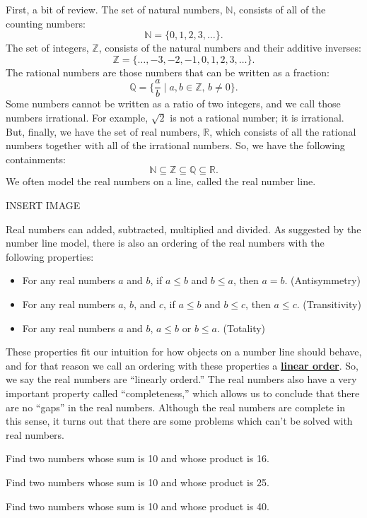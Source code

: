 \documentclass[11pt]{article}
\newenvironment{task}
	{\begin{mdframed}[linecolor=lightgray, linewidth=3pt]\raggedright}
	{\end{mdframed}}
\renewcommand\emph[1]{\underline{\bf{#1}}} %
\theoremstyle{definition}
\begin{document}
First, a bit of review. The set of natural numbers, $\mathbb{N}$, consists of all of the counting numbers:
\[ \mathbb{N} = \{ 0, 1, 2, 3, \dots \}.\]
The set of integers, $\mathbb{Z}$, consists of the natural numbers and their additive inverses:
\[ \mathbb{Z} = \{ \dots,-3,-2,-1,0, 1, 2, 3, \dots \}.\]
The rational numbers are those numbers that can be written as a fraction:
\[ \mathbb{Q} = \{ \frac{a}{b} \mid a, b\in \mathbb{Z},\, b \neq 0 \}.\]
Some numbers cannot be written as a ratio of two integers, and we call those numbers irrational. For example, $\sqrt{2}$ is not a rational number; it is
irrational. But, finally, we have the set of real numbers, $\mathbb{R}$, which consists of all the rational numbers together with all of the irrational numbers. 
So, we have the following containments:
\[ \mathbb{N} \subseteq \mathbb{Z} \subseteq \mathbb{Q} \subseteq \mathbb{R}.\]
We often model the real numbers on a line, called the real number line. 
\begin{center}
  INSERT IMAGE
\end{center}
Real numbers can added, subtracted, multiplied and divided. As suggested by the number line model, there is also an ordering of the real 
numbers with the following properties:
\begin{itemize}
  \item For any real numbers $a$ and $b$, if $a\leq b$ and $b\leq a$, then $a=b$. (Antisymmetry)
  \item For any real numbers $a$, $b$, and $c$, if $a \leq b$ and $b\leq c$, then $a\leq c$. (Transitivity)
  \item For any real numbers $a$ and $b$, $a\leq b$ or $b\leq a$. (Totality)
\end{itemize}

These properties fit our intuition for how objects on a number line should behave, and for that reason we call an ordering with these properties a 
\emph{linear order}. So, we say the real numbers are ``linearly orderd.'' The real numbers also have a very important property called ``completeness,'' 
which allows us to conclude that there are no ``gaps'' in the real numbers. Although the real numbers are complete in this sense, it turns out that there 
are some problems which can't be solved with real numbers.

\begin{task}
  Find two numbers whose sum is 10 and whose product is 16.

  Find two numbers whose sum is 10 and whose product is 25.

  Find two numbers whose sum is 10 and whose product is 40.
\end{task}
\end{document}
